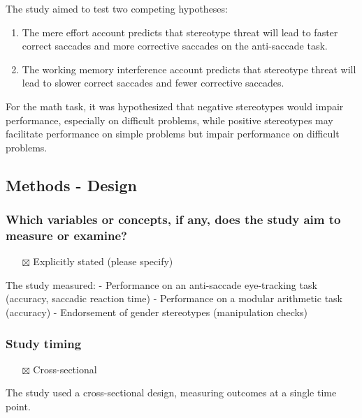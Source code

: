 \documentclass[
  doc, a4paper]{apa7}
\providecommand{\tightlist}{%
  \setlength{\itemsep}{0pt}\setlength{\parskip}{0pt}}
\begin{document}
The study aimed to test two competing hypotheses:

\begin{enumerate}
\def\labelenumi{\arabic{enumi}.}
\item
  The mere effort account predicts that stereotype threat will lead to faster correct saccades and more corrective saccades on the anti-saccade task.
\item
  The working memory interference account predicts that stereotype threat will lead to slower correct saccades and fewer corrective saccades.
\end{enumerate}

For the math task, it was hypothesized that negative stereotypes would impair performance, especially on difficult problems, while positive stereotypes may facilitate performance on simple problems but impair performance on difficult problems.

\subsection{Methods - Design}\label{methods---design}

\subsubsection{Which variables or concepts, if any, does the study aim to measure or examine?}\label{which-variables-or-concepts-if-any-does-the-study-aim-to-measure-or-examine}

\begin{itemize}
\tightlist
\item[$\boxtimes$]
  Explicitly stated (please specify)
\end{itemize}

The study measured:
- Performance on an anti-saccade eye-tracking task (accuracy, saccadic reaction time)
- Performance on a modular arithmetic task (accuracy)
- Endorsement of gender stereotypes (manipulation checks)

\subsubsection{Study timing}\label{study-timing}

\begin{itemize}
\tightlist
\item[$\boxtimes$]
  Cross-sectional
\end{itemize}

The study used a cross-sectional design, measuring outcomes at a single time point.
\end{document}
